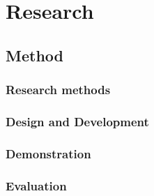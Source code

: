 \chapter{Research}

\section{Method}

\subsection{Research methods}

\subsection{Design and Development}

\subsection{Demonstration}

\subsection{Evaluation}
